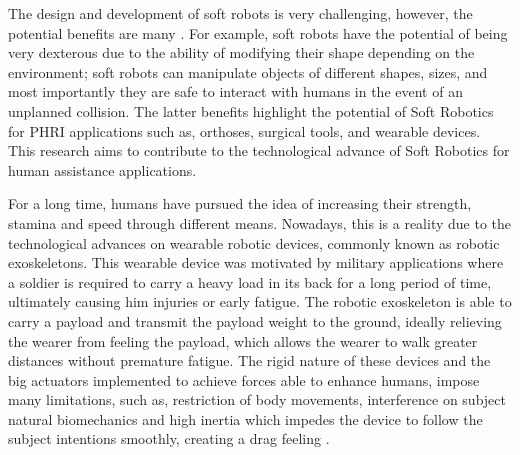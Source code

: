 The design and development of soft robots is very challenging, however, the potential benefits are many \cite{iida2011soft}. For example, soft robots have the potential of being very dexterous due to the ability of modifying their shape depending on the environment; soft robots can manipulate objects of different shapes, sizes, and most importantly they are safe to interact with humans in the event of an unplanned collision. The latter benefits highlight the potential of Soft Robotics for PHRI applications such as, orthoses, surgical tools, and wearable devices. This research aims to contribute to the technological advance of Soft Robotics for human assistance applications.

For a long time, humans have pursued the idea of increasing their strength, stamina and speed through different means. Nowadays, this is a reality due to the technological advances on wearable robotic devices, commonly known as robotic exoskeletons. This wearable device was motivated by military applications where a soldier is required to carry a heavy load in its back for a long period of time, ultimately causing him injuries or early fatigue. The robotic exoskeleton is able to carry a payload and transmit the payload weight to the ground, ideally relieving the wearer from feeling the payload, which allows the wearer to walk greater distances without premature fatigue. The rigid nature of these devices and the big actuators implemented to achieve forces able to enhance humans, impose many limitations, such as, restriction of body movements, interference on subject natural biomechanics and high inertia which impedes the device to follow the subject intentions smoothly, creating a drag feeling \cite{asbeck2014stronger}.

